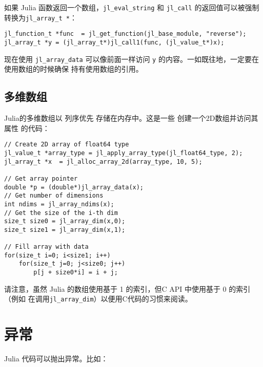 如果 Julia 函数返回一个数组，\texttt{jl\_eval\_string} 和 \texttt{jl\_call} 的返回值可以被强制转换为\texttt{jl\_array\_t *}：




\begin{lstlisting}
jl_function_t *func  = jl_get_function(jl_base_module, "reverse");
jl_array_t *y = (jl_array_t*)jl_call1(func, (jl_value_t*)x);
\end{lstlisting}



现在使用 \texttt{jl\_array\_data} 可以像前面一样访问 \texttt{y} 的内容。一如既往地，一定要在使用数组的时候确保 持有使用数组的引用。



\hypertarget{14703069974979105074}{}


\subsection{多维数组}



Julia的多维数组以 列序优先 存储在内存中。这是一些 创建一个2D数组并访问其属性 的代码：




\begin{lstlisting}
// Create 2D array of float64 type
jl_value_t *array_type = jl_apply_array_type(jl_float64_type, 2);
jl_array_t *x  = jl_alloc_array_2d(array_type, 10, 5);

// Get array pointer
double *p = (double*)jl_array_data(x);
// Get number of dimensions
int ndims = jl_array_ndims(x);
// Get the size of the i-th dim
size_t size0 = jl_array_dim(x,0);
size_t size1 = jl_array_dim(x,1);

// Fill array with data
for(size_t i=0; i<size1; i++)
    for(size_t j=0; j<size0; j++)
        p[j + size0*i] = i + j;
\end{lstlisting}



请注意，虽然 Julia 的数组使用基于 1 的索引，但C API 中使用基于 0 的索引（例如 在调用\texttt{jl\_array\_dim}）以便用C代码的习惯来阅读。



\hypertarget{4029112619480312893}{}


\section{异常}



Julia 代码可以抛出异常。比如：




